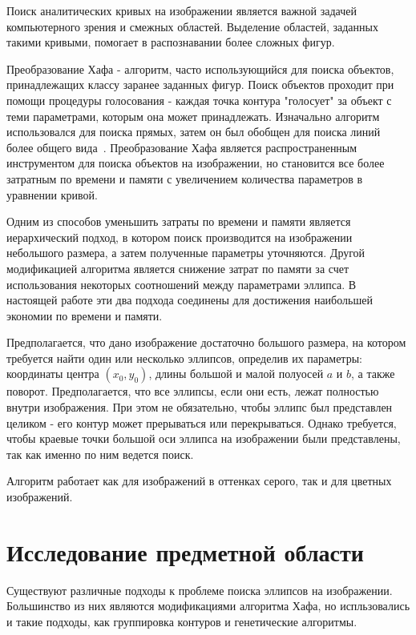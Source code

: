 






\tableofcontents
\clearpage

\Intro
Поиск аналитических кривых на изображении является важной задачей компьютерного зрения и смежных областей. Выделение областей, заданных такими кривыми, помогает в распознавании более сложных фигур.

Преобразование Хафа - алгоритм, часто использующийся для поиска объектов, принадлежащих классу заранее заданных фигур. 
Поиск объектов проходит при помощи процедуры голосования - каждая точка контура "голосует" за объект с теми параметрами, которым она может принадлежать. 
Изначально алгоритм использовался для поиска прямых, затем он был обобщен для поиска линий более общего вида~\autocite{Duda}.
Преобразование Хафа является распространенным инструментом для поиска объектов на изображении, но становится все более затратным по времени и памяти с увеличением количества параметров в уравнении кривой.

Одним из способов уменьшить затраты по времени и памяти является иерархический подход, в котором поиск производится на изображении небольшого размера, а затем полученные параметры уточняются. 
Другой модификацией алгоритма является снижение затрат по памяти за счет использования некоторых соотношений между параметрами эллипса.
В настоящей работе эти два подхода соединены для достижения наибольшей экономии по времени и памяти.

Предполагается, что дано изображение достаточно большого размера, на котором требуется найти один или несколько эллипсов, определив их параметры: 
координаты центра \((x_0, y_0)\), длины большой и малой полуосей \(a\) и \(b\), а также поворот. Предполагается, что все эллипсы, если они есть, лежат 
полностью внутри изображения. При этом не обязательно, чтобы эллипс был представлен целиком - его контур может прерываться или перекрываться. 
Однако требуется, чтобы краевые точки большой оси эллипса на изображении были представлены, так как именно по ним ведется поиск.  

Алгоритм работает как для изображений в оттенках серого, так и для цветных изображений.

\section{Исследование предметной области}
Существуют различные подходы к проблеме поиска эллипсов на изображении.  Большинство из них являются модификациями алгоритма Хафа, 
но испльзовались и такие подходы, как группировка контуров и генетические алгоритмы.

